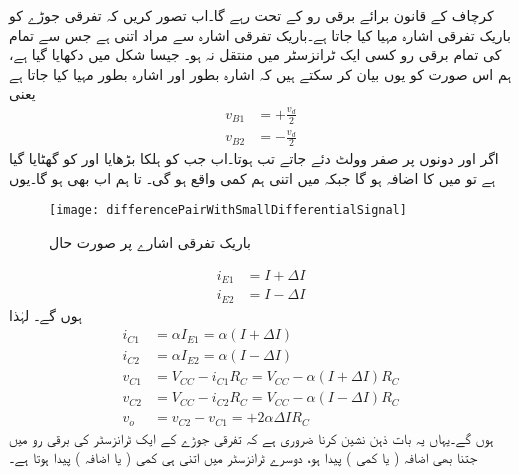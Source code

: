 کرچاف کے قانون برائے برقی رو کے تحت  رہے گا۔اب تصور کریں کہ تفرقی جوڑے کو باریک تفرقی اشارہ  مہیا کیا جاتا ہے۔باریک تفرقی اشارہ سے مراد اتنی  ہے جس سے تمام کی تمام برقی رو   کسی ایک ٹرانزسٹر میں منتقل نہ ہو۔ جیسا شکل   میں دکھایا گیا ہے، ہم اس صورت کو یوں بیان کر سکتے ہیں کہ    اشارہ بطور  اور   اشارہ بطور  مہیا کیا جاتا ہے یعنی
\begin{align*}
v_{B1}&=+\frac{v_d}{2}\\
v_{B2}&=-\frac{v_d}{2}
\end{align*}
اگر   اور  دونوں پر صفر وولٹ دئے جاتے تب  ہوتا۔اب جب   کو ہلکا بڑھایا اور  کو گھٹایا  گیا ہے تو   میں   کا اضافہ ہو گا جبکہ   میں اتنی ہم کمی واقع ہو گی۔ تا ہم اب بھی  ہو گا۔یوں
\begin{figure}
\centering
\texttt{[image: differencePairWithSmallDifferentialSignal]}
\caption{ باریک تفرقی اشارے پر صورت حال}
\label{شکل_باریک_تفرقی_اشارے_پر_صورت_حال}
\end{figure}
%
\begin{align*}
i_{E1}&=I+\Delta I\\
i_{E2}&=I-\Delta I
\end{align*}
ہوں  گے۔ لہٰذا
\begin{align*}
i_{C1}&=\alpha I_{E1}=\alpha \left(I+\Delta I \right )\\
i_{C2}&=\alpha I_{E2}=\alpha \left(I-\Delta I \right )\\
v_{C1}&=V_{CC}-i_{C1}R_C=V_{CC}-\alpha \left(I+\Delta I \right )R_C\\
v_{C2}&=V_{CC}-i_{C2}R_C=V_{CC}-\alpha \left(I-\Delta I \right )R_C\\
v_o&=v_{C2}-v_{C1}=+2 \alpha \Delta I R_C
\end{align*}
ہوں گے۔یہاں یہ بات ذہن نشین کرنا ضروری ہے کہ تفرقی جوڑے کے ایک ٹرانزسٹر کی برقی رو میں جتنا بھی اضافہ ( یا کمی ) پیدا ہو، دوسرے ٹرانزسٹر میں اتنی ہی کمی ( یا اضافہ ) پیدا ہوتا ہے۔

